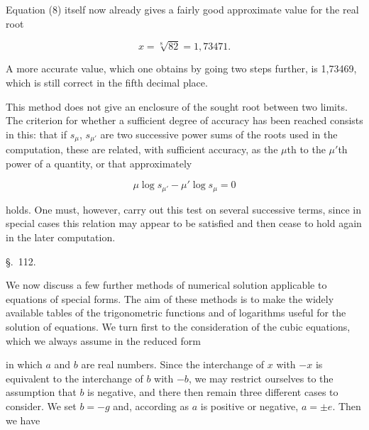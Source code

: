 
Equation (8) itself now already gives a fairly good approximate value for the real root

\[
x = \sqrt[8]{82} = 1{,}73471.
\]

A more accurate value, which one obtains by going two steps further, is 1,73469, which is still correct in the fifth decimal place.

This method does not give an enclosure of the sought root between two limits. The criterion for whether a sufficient degree of accuracy has been reached consists in this: that if $s_\mu$, $s_{\mu'}$ are two successive power sums of the roots used in the computation, these are related, with sufficient accuracy, as the $\mu$th to the $\mu'$th power of a quantity, or that approximately

\[
\mu \log s_{\mu'} - \mu' \log s_\mu = 0
\]

holds. One must, however, carry out this test on several successive terms, since in special cases this relation may appear to be satisfied and then cease to hold again in the later computation.

\begin{center}
\S.\ 112.


\end{center}

We now discuss a few further methods of numerical solution applicable to equations of special forms. The aim of these methods is to make the widely available tables of the trigonometric functions and of logarithms useful for the solution of equations. We turn first to the consideration of the cubic equations, which we always assume in the reduced form


in which $a$ and $b$ are real numbers. Since the interchange of $x$ with $-x$ is equivalent to the interchange of $b$ with $-b$, we may restrict ourselves to the assumption that $b$ is negative, and there then remain three different cases to consider. We set $b = -g$ and, according as $a$ is positive or negative, $a = \pm e$. Then we have
